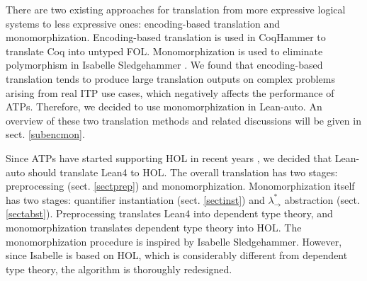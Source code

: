   There are two existing approaches for translation from more expressive
  logical systems to less expressive ones: encoding-based translation and monomorphization.
  Encoding-based translation is used in CoqHammer \cite{Czajka2018HammerFC}
  to translate Coq into untyped FOL. Monomorphization is used to
  eliminate polymorphism in Isabelle Sledgehammer \cite{Blanchette2016HammeringTQ}\cite{Paulson2012ThreeYO}.
  We found that encoding-based translation tends to produce large translation outputs
  on complex problems arising from real ITP use cases, which negatively affects the performance of ATPs.
  Therefore, we decided to use monomorphization in Lean-auto. An overview of these two
  translation methods and related discussions will be given in sect. \ref{subencmon}.

  Since ATPs have started supporting HOL in recent years \cite{HOVampire}\cite{ZipperpositionMakeWork}\cite{HOEProver},
  we decided that Lean-auto should translate Lean4 to HOL. The overall translation has
  two stages: preprocessing (sect. \ref{sectprep}) and monomorphization.
  Monomorphization itself has two stages: quantifier instantiation (sect. \ref{sectinst})
  and $\lambda_\to^*$ abstraction (sect. \ref{sectabst}). Preprocessing translates Lean4
  into dependent type theory, and monomorphization translates dependent type theory
  into HOL. The monomorphization procedure is inspired by Isabelle Sledgehammer.
  However, since Isabelle is based on HOL, which is considerably different from
  dependent type theory, the algorithm is thoroughly redesigned.